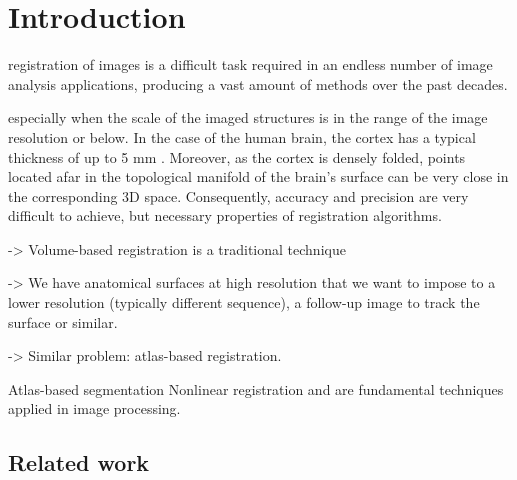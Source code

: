 \section{Introduction}
\label{sec:introduction}

 registration of images is a difficult task required
  in an endless number of image analysis applications, producing a vast amount of
  methods \citep{sotiras_deformable_2013} over the past decades.

   especially when the scale of the imaged structures is in the range of the
  image resolution or below.
In the case of the human brain, the cortex has a typical thickness of up to 5 mm
  \citep{fischl_measuring_2000}.
Moreover, as the cortex is densely folded, points located afar in the topological
  manifold of the brain's surface can be very close in the corresponding 3D space.
Consequently, accuracy and precision are very difficult to achieve, but necessary properties
  of registration algorithms.


-> Volume-based registration is a traditional technique

-> We have anatomical surfaces at high resolution that we want to impose to a
lower resolution (typically different sequence), a follow-up image to track the surface
or similar.

-> Similar problem: atlas-based registration.

Atlas-based segmentation Nonlinear registration and  are fundamental techniques applied in
  image processing.

\subsection{Related work}
\label{sec:methods_background}

